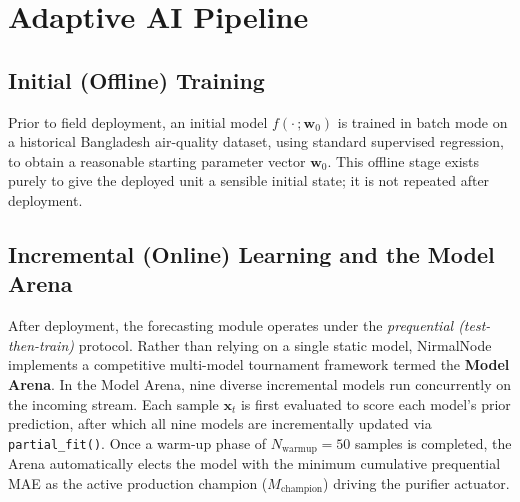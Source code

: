 \FloatBarrier

\section{Adaptive AI Pipeline}
\label{sec:meth-ai-pipeline}

\subsection{Initial (Offline) Training}
Prior to field deployment, an initial model $f(\cdot\,;\mathbf{w}_0)$ is trained in batch mode on a historical Bangladesh air-quality dataset, using standard supervised regression, to obtain a reasonable starting parameter vector $\mathbf{w}_0$. This offline stage exists purely to give the deployed unit a sensible initial state; it is not repeated after deployment.

\subsection{Incremental (Online) Learning and the Model Arena}
After deployment, the forecasting module operates under the \emph{prequential (test-then-train)} protocol. Rather than relying on a single static model, NirmalNode implements a competitive multi-model tournament framework termed the \textbf{Model Arena}. In the Model Arena, nine diverse incremental models run concurrently on the incoming stream. Each sample $\mathbf{x}_t$ is first evaluated to score each model's prior prediction, after which all nine models are incrementally updated via \texttt{partial\_fit()}. Once a warm-up phase of $N_{\text{warmup}} = 50$ samples is completed, the Arena automatically elects the model with the minimum cumulative prequential MAE as the active production champion ($M_{\text{champion}}$) driving the purifier actuator.

